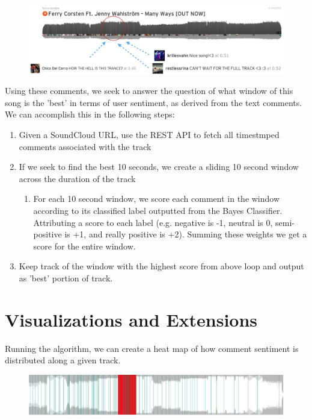 \documentclass[12pt]{dalcsthesis}
\begin{document}
\begin{figure}[h]
\includegraphics[scale=.45]{example_comments}
\centering
\end{figure}

Using these comments, we seek to answer the question of what window of this song is the 'best' in terms of user sentiment, as derived from the text comments. We can accomplish this in the following steps:

\begin{enumerate}
  \item Given a SoundCloud URL, use the REST API to fetch all timestmped comments associated with the track
  \item If we seek to find the best 10 seconds, we create a sliding 10 second window across the duration of the track
	\begin{enumerate}
		\item For each 10 second window, we score each comment in the window according to its classified label outputted from the Bayes Classifier. Attributing a score to each label (e.g. negative is -1, neutral is 0, semi-positive is +1, and really positive is +2). Summing these weights we get a score for the entire window.  
	\end{enumerate}
  \item Keep track of the window with the highest score from above loop and output as 'best' portion of track.
\end{enumerate}

\section{Visualizations and Extensions}

Running the algorithm, we can create a heat map of how comment sentiment is distributed along a given track. 

\begin{figure}[h]
\includegraphics[scale=.45]{best_window}
\centering
\end{figure}
\end{document}
